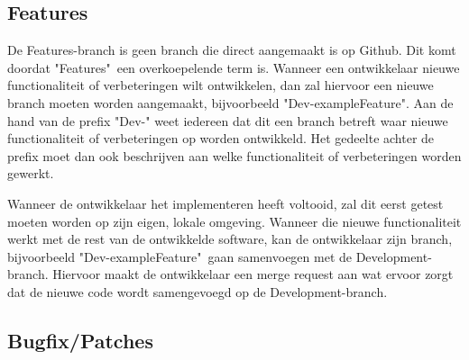 	\subsection{Features}
	De Features-branch is geen branch die direct aangemaakt is op Github. Dit komt doordat "Features"\ een overkoepelende term is. Wanneer een ontwikkelaar nieuwe functionaliteit of verbeteringen wilt ontwikkelen, dan zal hiervoor een nieuwe branch moeten worden aangemaakt, bijvoorbeeld "Dev-exampleFeature". Aan de hand van de prefix "Dev-" weet iedereen dat dit een branch betreft waar nieuwe functionaliteit of verbeteringen op worden ontwikkeld. Het gedeelte achter de prefix moet dan ook beschrijven aan welke functionaliteit of verbeteringen worden gewerkt.
	
	
	Wanneer de ontwikkelaar het implementeren heeft voltooid, zal dit eerst getest moeten worden op zijn eigen, lokale omgeving. Wanneer die nieuwe functionaliteit werkt met de rest van de ontwikkelde software, kan de ontwikkelaar zijn branch, bijvoorbeeld "Dev-exampleFeature"\ gaan samenvoegen met de Development-branch. Hiervoor maakt de ontwikkelaar een merge request aan wat ervoor zorgt dat de nieuwe code wordt samengevoegd op de Development-branch.
	
	\subsection{Bugfix/Patches}